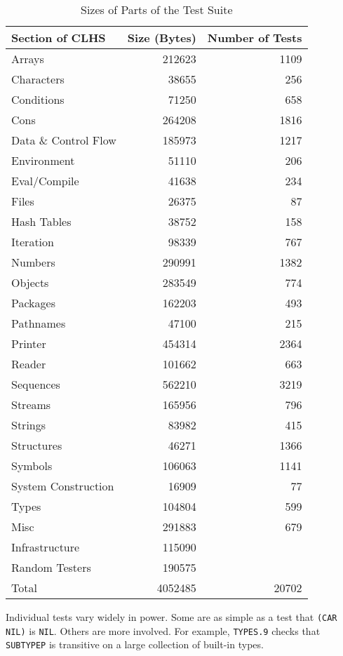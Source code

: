 \documentclass[11pt]{article}
\begin{document}
\begin{table}
\begin{center}
\begin{tabular}{|l|r|r|}
\hline
Section of CLHS & Size (Bytes) & Number of Tests \\
\hline \hline
Arrays & 212623 & 1109 \\
Characters & 38655 & 256  \\
Conditions & 71250 & 658 \\
Cons & 264208 & 1816 \\
Data \& Control Flow & 185973 & 1217 \\
Environment & 51110 & 206 \\
Eval/Compile & 41638 & 234 \\
Files & 26375 & 87 \\
Hash Tables & 38752 & 158 \\
Iteration & 98339 & 767  \\
Numbers & 290991 & 1382 \\
Objects & 283549 & 774 \\
Packages & 162203 & 493 \\
Pathnames & 47100 & 215 \\
Printer & 454314 & 2364 \\
Reader & 101662 & 663 \\
Sequences & 562210 & 3219 \\
Streams & 165956 & 796 \\
Strings & 83982 & 415 \\
Structures & 46271 & 1366 \\
Symbols & 106063 & 1141 \\
System Construction & 16909 & 77 \\
Types & 104804 & 599 \\
Misc & 291883 & 679 \\ \hline
Infrastructure & 115090 & \\
Random Testers & 190575 & \\
\hline
Total & 4052485 & 20702 \\
\hline
\end{tabular}
\end{center}

\caption{\label{tab:testsize} Sizes of Parts of the Test Suite}
\end{table}

Individual tests vary widely in power.  Some are as simple as a
test that {\tt (CAR NIL)} is {\tt NIL}.  Others are more involved.
For example, {\tt TYPES.9} checks that {\tt SUBTYPEP} is transitive
on a large collection of built-in types.
\end{document}
